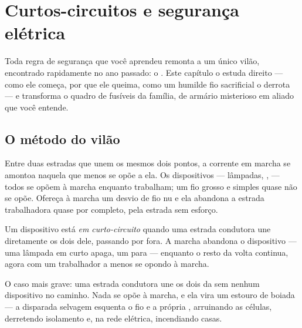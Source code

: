 \chapter{Curtos-circuitos e segurança elétrica}\label{ch:g7:short-circuits-safety}

Toda regra de segurança que você aprendeu remonta a um único vilão,
encontrado rapidamente no ano passado: o . Este
capítulo o estuda direito --- como ele começa, por que ele queima,
como um humilde fio sacrificial o derrota --- e transforma o quadro
de fusíveis da família, de armário misterioso em aliado que você
entende.

\section{O método do vilão}

\begin{proposition}\label{prop:g7:short-circuits-safety:effortless}
Entre duas estradas que unem os mesmos dois pontos, a corrente em
marcha se amontoa naquela que menos se opõe a ela. Os dispositivos
--- lâmpadas, ,  --- todos se opõem à marcha
enquanto trabalham; um fio grosso e simples quase não se opõe.
Ofereça à marcha um desvio de fio nu e ela abandona a estrada
trabalhadora quase por completo, pela estrada sem esforço.
\end{proposition}

\begin{definition}\label{def:g7:short-circuits-safety:device}
Um dispositivo está \emph{em curto-circuito}
quando uma estrada condutora une diretamente os dois  dele,
passando por fora. A marcha abandona o dispositivo --- uma lâmpada em
curto apaga, um  para --- enquanto o resto da volta continua,
agora com um trabalhador a menos se opondo à marcha.
\end{definition}

\begin{definition}\label{def:g7:short-circuits-safety:battery}
O caso mais grave: uma estrada condutora une os dois  da
\emph{} sem nenhum dispositivo no caminho. Nada se opõe à
marcha, e ela vira um estouro de boiada --- a disparada selvagem
esquenta o fio e a própria , arruinando as células, derretendo
isolamento e, na rede elétrica, incendiando casas.
\end{definition}

